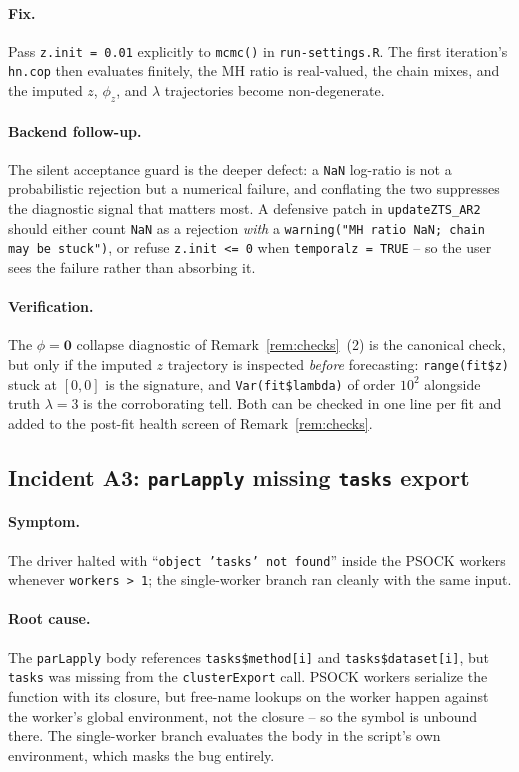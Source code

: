 \documentclass[11pt]{article}
\theoremstyle{definition}
\theoremstyle{remark}
\begin{document}
\paragraph{Fix.}
Pass \texttt{z.init = 0.01} explicitly to \texttt{mcmc()} in
\texttt{run-settings.R}. The first iteration's \texttt{hn.cop} then
evaluates finitely, the MH ratio is real-valued, the chain mixes,
and the imputed $z$, $\phi_z$, and $\lambda$ trajectories become
non-degenerate.

\paragraph{Backend follow-up.}
The silent acceptance guard is the deeper defect: a \texttt{NaN}
log-ratio is not a probabilistic rejection but a numerical failure,
and conflating the two suppresses the diagnostic signal that
matters most. A defensive patch in \texttt{updateZTS\_AR2} should
either count \texttt{NaN} as a rejection \emph{with} a
\texttt{warning("MH ratio NaN; chain may be stuck")}, or refuse
\texttt{z.init <= 0} when \texttt{temporalz = TRUE} -- so the user
sees the failure rather than absorbing it.

\paragraph{Verification.}
The $\phi = \bm 0$ collapse diagnostic of
Remark~\ref{rem:checks}~(2) is the canonical check, but only if the
imputed $z$ trajectory is inspected \emph{before} forecasting:
\texttt{range(fit\$z)} stuck at $[0,0]$ is the signature, and
\texttt{Var(fit\$lambda)} of order $10^2$ alongside truth $\lambda
= 3$ is the corroborating tell. Both can be checked in one line per
fit and added to the post-fit health screen of
Remark~\ref{rem:checks}.

\subsection{Incident A3: \texttt{parLapply} missing \texttt{tasks} export}
\label{sec:audit-psock}

\paragraph{Symptom.}
The driver halted with ``\texttt{object 'tasks' not found}'' inside
the PSOCK workers whenever \texttt{workers > 1}; the single-worker
branch ran cleanly with the same input.

\paragraph{Root cause.}
The \texttt{parLapply} body references \texttt{tasks\$method[i]} and
\texttt{tasks\$dataset[i]}, but \texttt{tasks} was missing from the
\texttt{clusterExport} call. PSOCK workers serialize the function
with its closure, but free-name lookups on the worker happen against
the worker's global environment, not the closure -- so the symbol
is unbound there. The single-worker branch evaluates the body in
the script's own environment, which masks the bug entirely.
\end{document}
